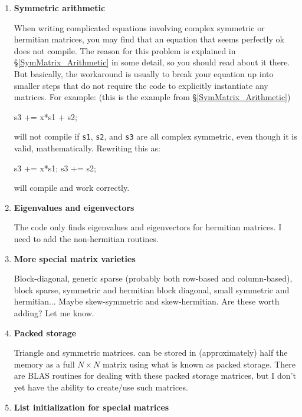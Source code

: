 \documentclass[twoside,letterpaper,11pt]{article}
\renewcommand{\tt}[1]{{\lstinline {#1}}}
\begin{document}
\begin{enumerate}
\item
\textbf{Symmetric arithmetic}

When writing complicated equations involving complex symmetric or hermitian matrices, 
you may find that an equation that seems perfectly ok does not compile.
The reason for this problem is explained in \S\ref{SymMatrix_Arithmetic} in some detail, 
so you should read about it there.  But basically, the workaround is usually
to break your equation up into smaller steps that do not require the code to 
explicitly instantiate any matrices.  For example: (this is the example from \S\ref{SymMatrix_Arithmetic})
\begin{tmvcode}
s3 += x*s1 + s2;
\end{tmvcode}
will not compile if \tt{s1}, \tt{s2}, and \tt{s3} are all complex symmetric, even though it is 
valid, mathematically.  Rewriting this as:
\begin{tmvcode}
s3 += x*s1;
s3 += s2;
\end{tmvcode}
will compile and work correctly.

\item
\textbf{Eigenvalues and eigenvectors}

The code only finds eigenvalues and eigenvectors for hermitian matrices.
I need to add the non-hermitian routines.

\item
\textbf{More special matrix varieties}

Block-diagonal, generic sparse (probably both
row-based and column-based), block sparse, symmetric and hermitian block
diagonal, small symmetric and hermitian...
Maybe skew-symmetric and skew-hermitian.  Are these worth adding?  Let me know.

\item
\textbf{Packed storage}

Triangle and symmetric matrices. can be stored in (approximately) half the 
memory as a full $N \times N$ matrix using what is known as packed storage.  
There are BLAS routines for dealing with
these packed storage matrices, but I don't yet have the ability to 
create/use such matrices.

\item
\textbf{List initialization for special matrices}


\end{enumerate}
\end{document}
